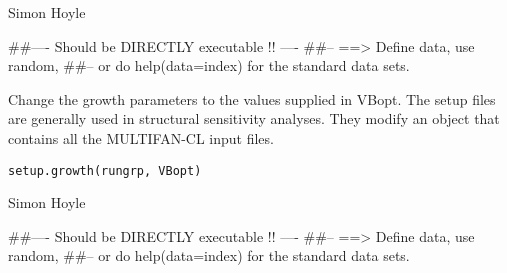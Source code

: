 \documentclass[a4paper]{book}
\begin{document}
%
\begin{Author}\relax

Simon Hoyle
\end{Author}
%
\begin{Examples}
\begin{ExampleCode}
##---- Should be DIRECTLY executable !! ----
##-- ==>  Define data, use random,
##--	or do  help(data=index)  for the standard data sets.

\end{ExampleCode}
\end{Examples}
%
\begin{Description}\relax

Change the growth parameters to the values supplied in VBopt. 
The setup files are generally used in structural sensitivity analyses. They modify an object that contains all the MULTIFAN-CL input files. 
\end{Description}
%
\begin{Usage}
\begin{verbatim}
setup.growth(rungrp, VBopt)
\end{verbatim}
\end{Usage}
%
\begin{Arguments}
\begin{ldescription}
\item[\code{rungrp}] 


\item[\code{VBopt}] 


\end{ldescription}
\end{Arguments}
%
\begin{Author}\relax

Simon Hoyle
\end{Author}
%
\begin{Examples}
\begin{ExampleCode}
##---- Should be DIRECTLY executable !! ----
##-- ==>  Define data, use random,
##--	or do  help(data=index)  for the standard data sets.

\end{ExampleCode}
\end{Examples}
\end{document}
